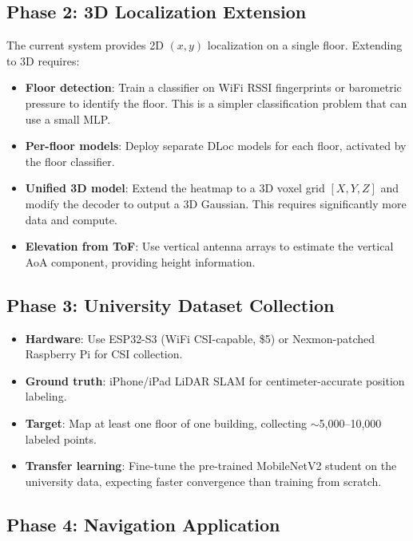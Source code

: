 \documentclass[11pt,a4paper]{article}
\begin{document}
\subsection{Phase 2: 3D Localization Extension}

The current system provides 2D $(x, y)$ localization on a single floor. Extending to 3D requires:

\begin{itemize}[leftmargin=*]
    \item \textbf{Floor detection}: Train a classifier on WiFi RSSI fingerprints or barometric pressure to identify the floor. This is a simpler classification problem that can use a small MLP.
    \item \textbf{Per-floor models}: Deploy separate DLoc models for each floor, activated by the floor classifier.
    \item \textbf{Unified 3D model}: Extend the heatmap to a 3D voxel grid $[X, Y, Z]$ and modify the decoder to output a 3D Gaussian. This requires significantly more data and compute.
    \item \textbf{Elevation from ToF}: Use vertical antenna arrays to estimate the vertical AoA component, providing height information.
\end{itemize}

\subsection{Phase 3: University Dataset Collection}

\begin{itemize}[leftmargin=*]
    \item \textbf{Hardware}: Use ESP32-S3 (WiFi CSI-capable, \$5) or Nexmon-patched Raspberry Pi for CSI collection.
    \item \textbf{Ground truth}: iPhone/iPad LiDAR SLAM for centimeter-accurate position labeling.
    \item \textbf{Target}: Map at least one floor of one building, collecting $\sim$5,000--10,000 labeled points.
    \item \textbf{Transfer learning}: Fine-tune the pre-trained MobileNetV2 student on the university data, expecting faster convergence than training from scratch.
\end{itemize}

\subsection{Phase 4: Navigation Application}
\end{document}
